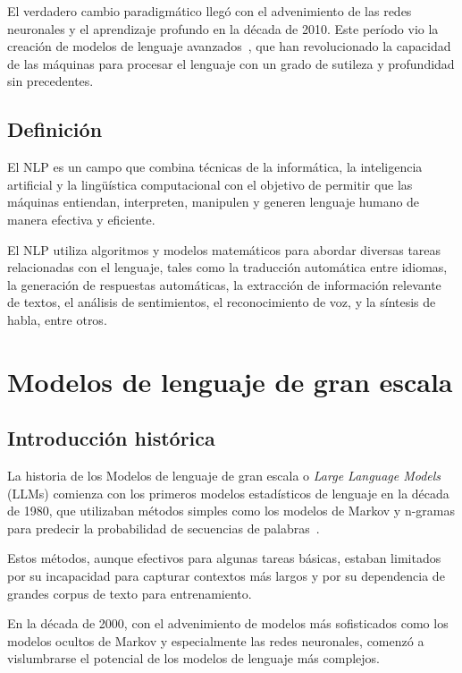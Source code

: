 El verdadero cambio paradigmático llegó con el advenimiento de las redes neuronales y el aprendizaje profundo en la
década de 2010.
Este período vio la creación de modelos de lenguaje avanzados~\cite{article_devlin_2019}, que han revolucionado la
capacidad de las máquinas para procesar el lenguaje con un grado de sutileza y profundidad sin precedentes.

\subsection*{Definición}

El NLP es un campo que combina técnicas de la informática, la inteligencia artificial y la lingüística computacional con
el objetivo de permitir que las máquinas entiendan, interpreten, manipulen y generen lenguaje humano de manera efectiva
y eficiente.

El NLP utiliza algoritmos y modelos matemáticos para abordar diversas tareas relacionadas con el lenguaje, tales como la
traducción automática entre idiomas, la generación de respuestas automáticas, la extracción de información relevante de
textos, el análisis de sentimientos, el reconocimiento de voz, y la síntesis de habla, entre otros.


\section{Modelos de lenguaje de gran escala}

\subsection*{Introducción histórica}
La historia de los Modelos de lenguaje de gran escala o \textit{Large Language Models} (LLMs) comienza con los
primeros modelos estadísticos de lenguaje en la década de 1980, que utilizaban métodos simples como los modelos de
Markov y n-gramas para predecir la probabilidad de secuencias de palabras~\cite{article_jelinek_1997}.

Estos métodos, aunque efectivos para algunas tareas básicas, estaban limitados por su incapacidad para capturar
contextos más largos y por su dependencia de grandes corpus de texto para entrenamiento.

En la década de 2000, con el advenimiento de modelos más sofisticados como los modelos ocultos de Markov y especialmente
las redes neuronales, comenzó a vislumbrarse el potencial de los modelos de lenguaje más complejos.

